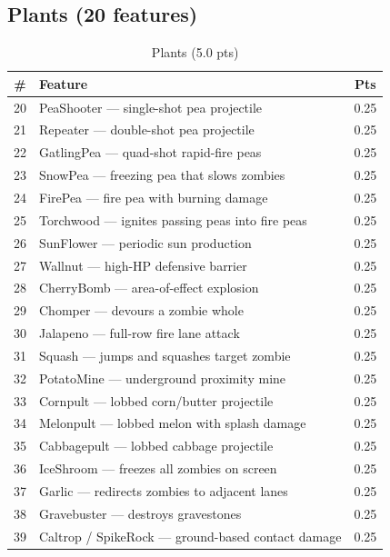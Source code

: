 \documentclass[12pt,a4paper]{article}
\begin{document}
\subsection{Plants (20 features)}
\begin{table}[htbp]
\centering
\tiny
\begin{tabular}{clc}
\toprule
\textbf{\#} & \textbf{Feature} & \textbf{Pts} \\
\midrule
20 & PeaShooter --- single-shot pea projectile & 0.25 \\
21 & Repeater --- double-shot pea projectile & 0.25 \\
22 & GatlingPea --- quad-shot rapid-fire peas & 0.25 \\
23 & SnowPea --- freezing pea that slows zombies & 0.25 \\
24 & FirePea --- fire pea with burning damage & 0.25 \\
25 & Torchwood --- ignites passing peas into fire peas & 0.25 \\
26 & SunFlower --- periodic sun production & 0.25 \\
27 & Wallnut --- high-HP defensive barrier & 0.25 \\
28 & CherryBomb --- area-of-effect explosion & 0.25 \\
29 & Chomper --- devours a zombie whole & 0.25 \\
30 & Jalapeno --- full-row fire lane attack & 0.25 \\
31 & Squash --- jumps and squashes target zombie & 0.25 \\
32 & PotatoMine --- underground proximity mine & 0.25 \\
33 & Cornpult --- lobbed corn/butter projectile & 0.25 \\
34 & Melonpult --- lobbed melon with splash damage & 0.25 \\
35 & Cabbagepult --- lobbed cabbage projectile & 0.25 \\
36 & IceShroom --- freezes all zombies on screen & 0.25 \\
37 & Garlic --- redirects zombies to adjacent lanes & 0.25 \\
38 & Gravebuster --- destroys gravestones & 0.25 \\
39 & Caltrop / SpikeRock --- ground-based contact damage & 0.25 \\
\bottomrule
\end{tabular}
\caption{Plants (5.0 pts)}
\end{table}

\clearpage
\end{document}

